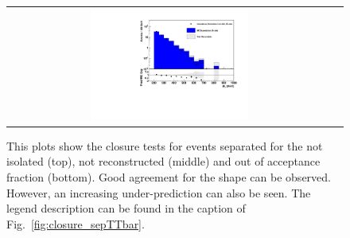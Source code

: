 \begin{figure}[tbhn]
\begin{center}
\begin{tabular}{cc}
\includegraphics[width=0.50\textwidth]{lostlepton/plots/closure/MHTttbarAccE.pdf}\\
\end{tabular}
\end{center}
\caption{This plots show the closure tests for \ttbar events separated for the not isolated (top), not reconstructed (middle) and out of acceptance fraction (bottom). Good agreement for the shape can be observed. However, an increasing under-prediction can also be seen. The legend description can be found in the caption of Fig.~\ref{fig:closure_sepTTbar}.
}
\label{fig:closure_ttbar_sep_MHT}
\end{figure}


